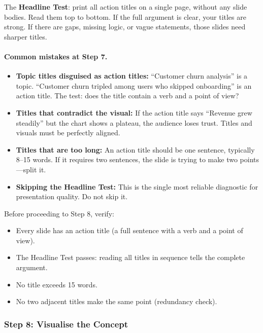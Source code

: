 The \textbf{Headline Test}: print all action titles on a single page, without any slide bodies. Read them top to bottom. If the full argument is clear, your titles are strong. If there are gaps, missing logic, or vague statements, those slides need sharper titles.

\paragraph{Common mistakes at Step 7.}
\begin{itemize}
  \item \textbf{Topic titles disguised as action titles:} ``Customer churn analysis'' is a topic. ``Customer churn tripled among users who skipped onboarding'' is an action title. The test: does the title contain a verb and a point of view?
  \item \textbf{Titles that contradict the visual:} If the action title says ``Revenue grew steadily'' but the chart shows a plateau, the audience loses trust. Titles and visuals must be perfectly aligned.
  \item \textbf{Titles that are too long:} An action title should be one sentence, typically 8--15 words. If it requires two sentences, the slide is trying to make two points---split it.
  \item \textbf{Skipping the Headline Test:} This is the single most reliable diagnostic for presentation quality. Do not skip it.
\end{itemize}

\begin{keybox}
Before proceeding to Step 8, verify:
\begin{itemize}[leftmargin=1.2em]
  \item Every slide has an action title (a full sentence with a verb and a point of view).
  \item The Headline Test passes: reading all titles in sequence tells the complete argument.
  \item No title exceeds 15 words.
  \item No two adjacent titles make the same point (redundancy check).
\end{itemize}
\end{keybox}

\subsubsection{Step 8: Visualise the Concept}

